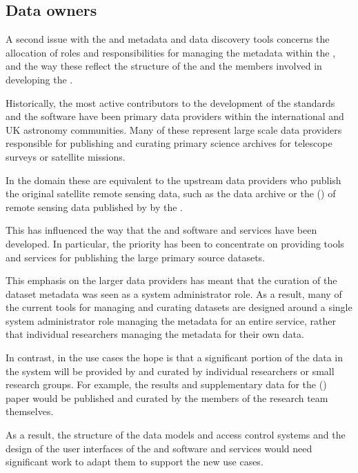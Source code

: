 \documentclass{article}
\begin{document}
\subsection{Data owners}

A second issue with the \cite{ivoa} and \cite{astro} metadata \cite{ivoa-reg}
and data discovery tools concerns the allocation of roles and responsibilities
for managing the metadata within the \cite{ivoa-reg}, and the way these
reflect the structure of the \cite{ivoa} and the members involved in
developing the \cite{ivoa-reg}.

Historically, the most active contributors to the development of the
\cite{ivoa} standards and the \cite{astro} software have been primary data
providers within the international and UK astronomy communities.
Many of these represent large scale data providers responsible for
publishing and curating primary science archives for telescope surveys or
satellite missions.

In the \cite{trop} domain these are equivalent to the upstream data
providers who publish the original satellite remote sensing data, such as the
\cite{landsat} data archive or the  (\cite{usgs-lta})
of remote sensing data published by by the \cite{usgs}.

This has influenced the way that the \cite{ivoa} and \cite{astro} software
and services have been developed. In particular, the priority has been
to concentrate on providing tools and
services for publishing the large primary source datasets.

This emphasis on the larger data providers has meant that the curation of the
dataset metadata was seen as a system administrator role. As a result, many
of the current tools for managing and curating datasets are designed around a
single system administrator role managing the metadata for an entire service,
rather that individual researchers managing the metadata for their own data.

In contrast, in the \cite{trop} use cases the hope is that a significant
portion of the data in the system will be provided by and curated by
individual researchers or small research groups.
For example, the results and supplementary data for the (\cite{mitchard-2014})
paper would be published and curated by the members of the research team
themselves.

As a result, the structure of the data models and access control systems
and the design of the user interfaces of the \cite{ivoa} and \cite{astro}
software and services would need significant work to adapt them to support the new use cases. 
\end{document}
